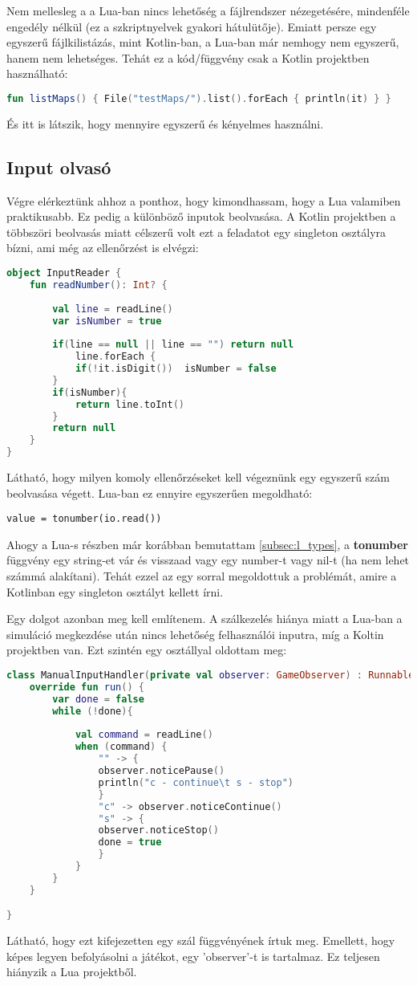 \normalsize
Nem mellesleg a a Lua-ban nincs lehetőség a fájlrendszer nézegetésére, mindenféle engedély nélkül (ez a szkriptnyelvek gyakori hátulütője). Emiatt persze egy egyszerű fájlkilistázás, mint Kotlin-ban, a Lua-ban már nemhogy nem egyszerű, hanem nem lehetséges. Tehát ez a kód/függvény csak a Kotlin projektben használható:
\scriptsize
\begin{lstlisting}[language = Kotlin]
fun listMaps() { File("testMaps/").list().forEach { println(it) } }
\end{lstlisting}
És itt is látszik, hogy mennyire egyszerű és kényelmes használni.

\subsection{Input olvasó}
\normalsize
Végre elérkeztünk ahhoz a ponthoz, hogy kimondhassam, hogy a Lua valamiben praktikusabb. Ez pedig a különböző inputok beolvasása. A Kotlin projektben a többszöri beolvasás miatt célszerű volt ezt a feladatot egy singleton osztályra bízni, ami még az ellenőrzést is elvégzi:
\scriptsize
\begin{lstlisting}[language = Kotlin]
object InputReader {
	fun readNumber(): Int? {
	
		val line = readLine()
		var isNumber = true
		
		if(line == null || line == "") return null
			line.forEach {
			if(!it.isDigit())  isNumber = false
		}
		if(isNumber){
			return line.toInt()
		}
		return null
	}
}
\end{lstlisting}
\normalsize
Látható, hogy milyen komoly ellenőrzéseket kell végeznünk egy egyszerű szám beolvasása végett. Lua-ban ez ennyire egyszerűen megoldható:
\scriptsize
\begin{lstlisting}[style=Lua]
 value = tonumber(io.read())
\end{lstlisting}
\normalsize
Ahogy a Lua-s részben már korábban bemutattam \ref{subsec:l_types}, a \textbf{tonumber} függvény egy string-et vár és visszaad vagy egy number-t vagy nil-t (ha nem lehet számmá alakítani). Tehát ezzel az egy sorral megoldottuk a problémát, amire a Kotlinban egy singleton osztályt kellett írni.

\newpage

Egy dolgot azonban meg kell említenem. A szálkezelés hiánya miatt a Lua-ban a simuláció megkezdése után nincs lehetőség felhasználói inputra, míg a Koltin projektben van. Ezt szintén egy osztállyal oldottam meg:
\scriptsize
\begin{lstlisting}[language = Kotlin]
class ManualInputHandler(private val observer: GameObserver) : Runnable {
	override fun run() {
		var done = false
		while (!done){
		
			val command = readLine()
			when (command) {
				"" -> {
				observer.noticePause()
				println("c - continue\t s - stop")
				}
				"c" -> observer.noticeContinue()
				"s" -> {
				observer.noticeStop()
				done = true
				}
			}
		}
	}

}
\end{lstlisting}
\normalsize
Látható, hogy ezt kifejezetten egy szál függvényének írtuk meg. Emellett, hogy képes legyen befolyásolni a játékot, egy 'observer'-t is tartalmaz. Ez teljesen hiányzik a Lua projektből. 

